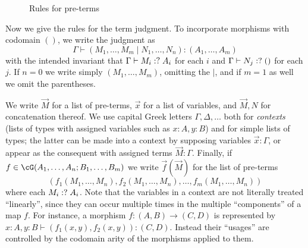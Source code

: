 \documentclass{book}
\let\types\vdash
\def\unit{\mathbf{1}}
\def\ttt{\mathsf{tt}}
\def\pair#1#2{\langle #1,#2\rangle}
\let\tensor\otimes
\begin{document}
\begin{figure}
  \centering
  \caption{Rules for pre-terms}
  \label{fig:pre-terms}
\end{figure}

Now we give the rules for the term judgment.
To incorporate morphisms with codomain $()$, we write the judgment as
\[\Gamma \types (M_1,\dots,M_m\mid N_1,\dots,N_n):(A_1,\dots,A_m)\]
with the intended invariant that $\Gamma\types M_i\pc A_i$ for each $i$ and $\Gamma\types N_j\pc ()$ for each $j$.
If $n=0$ we write simply $(M_1,\dots,M_m)$, omitting the $|$, and if $m=1$ as well we omit the parentheses.

We write $\vec M$ for a list of pre-terms, $\vec{x}$ for a list of variables, and $\vec M,N$ for concatenation thereof.
We use capital Greek letters $\Gamma,\Delta,\dots$ both for \emph{contexts} (lists of types with assigned variables such as $x:A,y:B$) and for simple lists of types; the latter can be made into a context by supposing variables $\vec{x}:\Gamma$, or appear as the consequent with assigned terms $\vec{M}:\Gamma$.
Finally, if $f\in\cG(A_1,\dots,A_n;B_1,\dots,B_m)$ we write $\vec{f}(\vec{M})$ for the list of pre-terms
\[(f_1(M_1,\dots,M_n),f_2(M_1,\dots,M_n),\dots,f_m(M_1,\dots,M_n))\]
where each $M_i \mathrel{\mathord{:}?} A_i$.
Note that the variables in a context are not literally treated ``linearly'', since they can occur multiple times in the multiple ``components'' of a map $f$.
For instance, a morphism $f:(A,B)\to (C,D)$ is represented by $x:A, y:B \types (f_1(x,y),f_2(x,y)):(C,D)$.
Instead their ``usages'' are controlled by the codomain arity of the morphisms applied to them.
\end{document}
